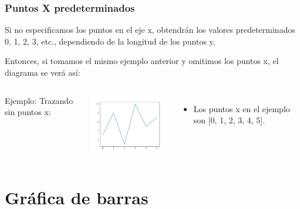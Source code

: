 \begin{frame}[fragile]
  \frametitle{Puntos X predeterminados}

  \vspace{\baselineskip}
  Si no especificamos los puntos en el eje x, obtendrán los
  valores predeterminados 0, 1, 2, 3, etc., dependiendo de la
  longitud de los puntos y.

  Entonces, si tomamos el mismo ejemplo anterior y omitimos los
  puntos x, el diagrama se verá así:
  \begin{columns}
        \begin{exampleblock}{Ejemplo:}
          Trazando sin puntos x:
          
        \end{exampleblock}
      \pausa
      \parbox{\textwidth}{\includegraphics[width=55mm]{ejemplos/e05.pdf}}
      \begin{itemize}
        \item Los puntos x en el ejemplo son [0, 1, 2, 3, 4, 5].
      \end{itemize}
  \end{columns}
\end{frame}

\section{Gráfica de barras}

